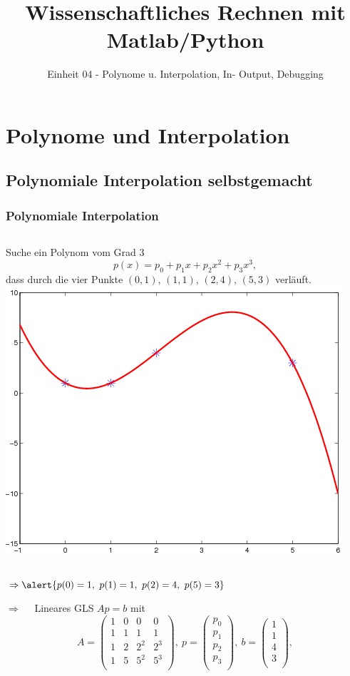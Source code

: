 \documentclass[hyperref={xetex}]{beamer}
\title{Wissenschaftliches Rechnen mit Matlab/Python}
\subtitle{Einheit 04 - Polynome u. Interpolation, In- Output, Debugging}
\begin{document}
\titlepage

\section{Polynome und Interpolation}

\subsection{Polynomiale Interpolation selbstgemacht}
% 
% 
\begin{frame}[fragile]\frametitle{Polynomiale Interpolation}
\begin{columns}[b]
Suche ein Polynom vom Grad 3
\[ p(x)= p_0 +p_1 x +p_2 x^2 +p_3 x^3,  \]
 dass durch die vier Punkte
$(0,1)$, $(1,1)$, $(2,4)$, $(5,3)$
verläuft.
\includegraphics[width=\textwidth]{figures/grafik_6}
\end{columns}
$\Rightarrow  \alert{ p(0)=1, \ p(1)=1, \ p(2)=4, \ p(5)=3}$

$\Rightarrow \quad$ Lineares GLS \alert{ $Ap=b$} mit
{\scriptsize \[ A= \left( \begin{array}{cccc}
1 & 0 & 0 & 0\\
1 & 1 & 1 & 1\\
1 & 2 & 2^2 & 2^3 \\
1 & 5 & 5^2 & 5^3 \\
\end{array} \right), \
p=\left( \begin{array}{c} 
p_0 \\ p_1 \\ p_2 \\p_3\\
\end{array} \right),
\
b=\left( \begin{array}{c} 
1 \\ 1 \\ 4 \\ 3\\
\end{array} \right),
\]}  
\end{frame}
\end{document}
